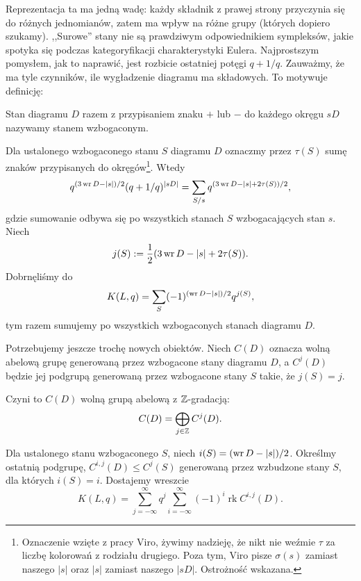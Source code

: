 Reprezentacja ta ma jedną wadę: każdy składnik z prawej strony przyczynia się do różnych jednomianów, zatem ma wpływ na różne grupy (których dopiero szukamy).
,,Surowe'' stany nie są prawdziwym odpowiednikiem sympleksów, jakie spotyka się podczas kategoryfikacji charakterystyki Eulera.
Najprostszym pomysłem, jak to naprawić, jest rozbicie ostatniej potęgi $q + 1/q$.
Zauważmy, że ma tyle czynników, ile wygładzenie diagramu ma składowych.
To motywuje definicję:

\begin{definition}
%
    Stan diagramu $D$ razem z przypisaniem znaku $+$ lub $-$ do każdego okręgu $sD$ nazywamy stanem wzbogaconym. 
\end{definition}

Dla ustalonego wzbogaconego stanu $S$ diagramu $D$ oznaczmy przez $\tau(S)$ sumę znaków przypisanych do okręgów\footnote{Oznaczenie wzięte z pracy Viro, żywimy nadzieję, że nikt nie weźmie $\tau$ za liczbę kolorowań z rodziału drugiego. Poza tym, Viro pisze $\sigma(s)$ zamiast naszego $|s|$ oraz $|s|$ zamiast naszego $|sD|$. Ostrożność wskazana.}.
Wtedy
\begin{equation}
    q^{(3 \operatorname{wr} D - |s|)/2} (q + 1/q)^{|sD|} = \sum_{S/s} q^{(3 \operatorname{wr} D - |s| + 2 \tau(S))/2},
\end{equation}
gdzie sumowanie odbywa się po wszystkich stanach $S$ wzbogacających stan $s$.
Niech
\begin{equation}
    j(S) := \frac 12 (3 \operatorname{wr} D - |s| + 2 \tau(S)).
\end{equation}
Dobrnęliśmy do
\begin{equation}
    K(L, q) = \sum_S (-1)^{(\operatorname{wr} D - |s|)/2} q^{j(S)},
\end{equation}
tym razem sumujemy po wszystkich wzbogaconych stanach diagramu $D$.

Potrzebujemy jeszcze trochę nowych obiektów.
Niech $C(D)$ oznacza wolną abelową grupę generowaną przez wzbogacone stany diagramu $D$, a $C^j(D)$ będzie jej podgrupą generowaną przez wzbogacone stany $S$ takie, że $j(S) = j$.

Czyni to $C(D)$ wolną grupą abelową z $\mathbb Z$-gradacją:
\begin{equation}
    C(D) = \bigoplus_{j \in \mathbb Z} C^j (D).
\end{equation}

Dla ustalonego stanu wzbogaconego $S$, niech $i(S) = (\operatorname{wr} D - |s|)/2$.
Określmy ostatnią podgrupę, $C^{i,j}(D) \le C^j(S)$ generowaną przez wzbudzone stany $S$, dla których $i(S) = i$.
Dostajemy wreszcie
\begin{equation}
    K(L, q) = \sum_{j = -\infty}^\infty q^j \sum_{i = -\infty}^\infty (-1)^i \operatorname{rk} C^{i, j}(D).
\end{equation}

